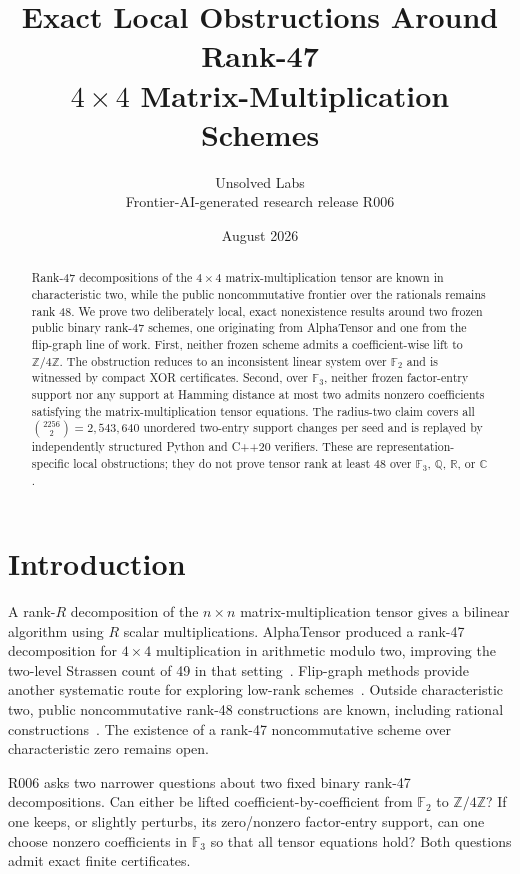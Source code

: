 \documentclass[11pt]{article}
\title{Exact Local Obstructions Around Rank-47\\$4\times4$ Matrix-Multiplication Schemes}
\author{Unsolved Labs\\\small Frontier-AI-generated research release R006}
\date{August 2026}
\newcommand{\F}{\mathbb{F}}
\newcommand{\Z}{\mathbb{Z}}
\begin{document}
\maketitle

\begin{abstract}
Rank-47 decompositions of the $4\times4$ matrix-multiplication tensor are known in characteristic two, while the public noncommutative frontier over the rationals remains rank 48. We prove two deliberately local, exact nonexistence results around two frozen public binary rank-47 schemes, one originating from AlphaTensor and one from the flip-graph line of work. First, neither frozen scheme admits a coefficient-wise lift to $\Z/4\Z$. The obstruction reduces to an inconsistent linear system over $\F_2$ and is witnessed by compact XOR certificates. Second, over $\F_3$, neither frozen factor-entry support nor any support at Hamming distance at most two admits nonzero coefficients satisfying the matrix-multiplication tensor equations. The radius-two claim covers all $\binom{2256}{2}=2{,}543{,}640$ unordered two-entry support changes per seed and is replayed by independently structured Python and C++20 verifiers. These are representation-specific local obstructions; they do not prove tensor rank at least 48 over $\F_3$, $\mathbb Q$, $\mathbb R$, or $\mathbb C$.
\end{abstract}

\section{Introduction}

A rank-$R$ decomposition of the $n\times n$ matrix-multiplication tensor gives a bilinear algorithm using $R$ scalar multiplications. AlphaTensor produced a rank-47 decomposition for $4\times4$ multiplication in arithmetic modulo two, improving the two-level Strassen count of 49 in that setting~\cite{alphatensor}. Flip-graph methods provide another systematic route for exploring low-rank schemes~\cite{flipgraphs}. Outside characteristic two, public noncommutative rank-48 constructions are known, including rational constructions~\cite{rank48rational,rank48accurate}. The existence of a rank-47 noncommutative scheme over characteristic zero remains open.

R006 asks two narrower questions about two fixed binary rank-47 decompositions. Can either be lifted coefficient-by-coefficient from $\F_2$ to $\Z/4\Z$? If one keeps, or slightly perturbs, its zero/nonzero factor-entry support, can one choose nonzero coefficients in $\F_3$ so that all tensor equations hold? Both questions admit exact finite certificates.
\end{document}
